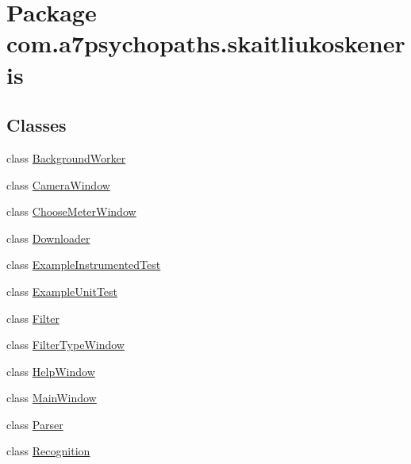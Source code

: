 \hypertarget{namespacecom_1_1a7psychopaths_1_1skaitliukoskeneris}{}\section{Package com.\+a7psychopaths.\+skaitliukoskeneris}
\label{namespacecom_1_1a7psychopaths_1_1skaitliukoskeneris}
\subsection*{Classes}
\begin{DoxyCompactItemize}
\item 
class \mbox{\hyperlink{classcom_1_1a7psychopaths_1_1skaitliukoskeneris_1_1_background_worker}{Background\+Worker}}
\item 
class \mbox{\hyperlink{classcom_1_1a7psychopaths_1_1skaitliukoskeneris_1_1_camera_window}{Camera\+Window}}
\item 
class \mbox{\hyperlink{classcom_1_1a7psychopaths_1_1skaitliukoskeneris_1_1_choose_meter_window}{Choose\+Meter\+Window}}
\item 
class \mbox{\hyperlink{classcom_1_1a7psychopaths_1_1skaitliukoskeneris_1_1_downloader}{Downloader}}
\item 
class \mbox{\hyperlink{classcom_1_1a7psychopaths_1_1skaitliukoskeneris_1_1_example_instrumented_test}{Example\+Instrumented\+Test}}
\item 
class \mbox{\hyperlink{classcom_1_1a7psychopaths_1_1skaitliukoskeneris_1_1_example_unit_test}{Example\+Unit\+Test}}
\item 
class \mbox{\hyperlink{classcom_1_1a7psychopaths_1_1skaitliukoskeneris_1_1_filter}{Filter}}
\item 
class \mbox{\hyperlink{classcom_1_1a7psychopaths_1_1skaitliukoskeneris_1_1_filter_type_window}{Filter\+Type\+Window}}
\item 
class \mbox{\hyperlink{classcom_1_1a7psychopaths_1_1skaitliukoskeneris_1_1_help_window}{Help\+Window}}
\item 
class \mbox{\hyperlink{classcom_1_1a7psychopaths_1_1skaitliukoskeneris_1_1_main_window}{Main\+Window}}
\item 
class \mbox{\hyperlink{classcom_1_1a7psychopaths_1_1skaitliukoskeneris_1_1_parser}{Parser}}
\item 
class \mbox{\hyperlink{classcom_1_1a7psychopaths_1_1skaitliukoskeneris_1_1_recognition}{Recognition}}
\end{DoxyCompactItemize}
